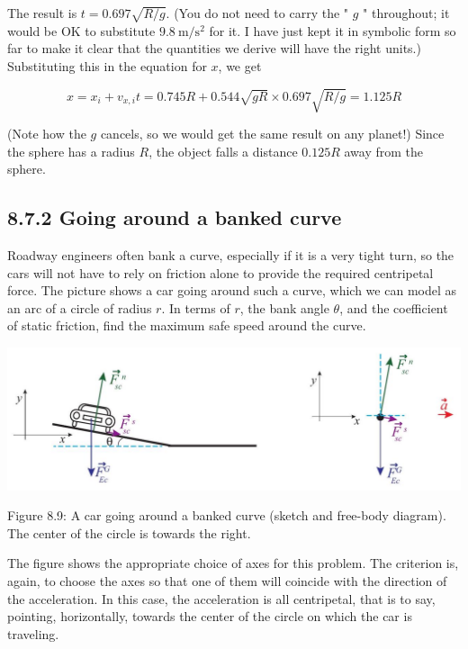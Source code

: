 \documentclass[10pt]{article}
\begin{document}
The result is $t=0.697 \sqrt{R / g}$. (You do not need to carry the " $g$ " throughout; it would be OK to substitute $9.8 \mathrm{~m} / \mathrm{s}^{2}$ for it. I have just kept it in symbolic form so far to make it clear that the quantities we derive will have the right units.) Substituting this in the equation for $x$, we get


\begin{equation*}
x=x_{i}+v_{x, i} t=0.745 R+0.544 \sqrt{g R} \times 0.697 \sqrt{R / g}=1.125 R \tag{8.54}
\end{equation*}


(Note how the $g$ cancels, so we would get the same result on any planet!) Since the sphere has a radius $R$, the object falls a distance $0.125 R$ away from the sphere.

\subsection*{8.7.2 Going around a banked curve}
Roadway engineers often bank a curve, especially if it is a very tight turn, so the cars will not have to rely on friction alone to provide the required centripetal force. The picture shows a car going around such a curve, which we can model as an arc of a circle of radius $r$. In terms of $r$, the bank angle $\theta$, and the coefficient of static friction, find the maximum safe speed around the curve.

\begin{center}
\includegraphics[max width=\textwidth]{2024_09_14_9969b06773f10b6936e8g-199}
\end{center}

Figure 8.9: A car going around a banked curve (sketch and free-body diagram). The center of the circle is towards the right.

The figure shows the appropriate choice of axes for this problem. The criterion is, again, to choose the axes so that one of them will coincide with the direction of the acceleration. In this case, the acceleration is all centripetal, that is to say, pointing, horizontally, towards the center of the circle on which the car is traveling.
\end{document}
